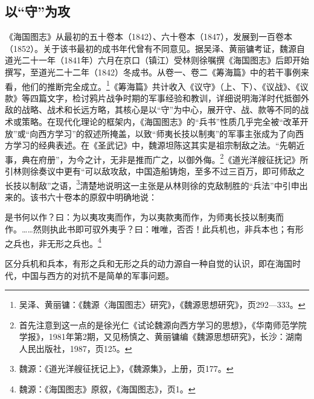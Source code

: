 \documentclass[a4paper, 12pt, openright]{ctexbook}
\renewenvironment{quote}
  {\list{}{\rightmargin2\ccwd \leftmargin2\ccwd \itemindent=2\ccwd \listparindent=2\ccwd}%
   \item\relax\small\kaishu\color{black}}
  {\endlist}
\begin{document}
\subsection{以“守”为攻}

《海国图志》从最初的五十卷本（1842）、六十卷本（1847），发展到一百卷本（1852）。关于该书最初的成书年代曾有不同意见。据吴泽、黄丽镛考证，魏源自道光二十一年（1841年）六月在京口（镇江）受林则徐嘱撰《海国图志》后即开始撰写，至道光二十二年（1842）冬成书。从卷一、卷二《筹海篇》中的若干事例来看，他们的推断完全成立。\footnote{吴泽、黄丽镛：《魏源〈海国图志〉研究》，《魏源思想研究》，页292—333。}《筹海篇》共计收入《议守》（上、下）、《议战》、《议款》等四篇文字，检讨鸦片战争时期的军事经验和教训，详细说明海洋时代抵御外敌的战略、战术和长远方略，其核心是以“守”为中心，展开守、战、款等不同的战术或策略。在现代化理论的框架内，《海国图志》的“兵书”性质几乎完全被“改革开放”或“向西方学习”的叙述所掩盖，以致“师夷长技以制夷”的军事主张成为了向西方学习的经典表述。在《圣武记》中，魏源坦陈这其实是祖宗制敌之法。“先朝近事，典在府册”，为今之计，无非是推而广之，以御外侮。\footnote{首先注意到这一点的是徐光仁《试论魏源向西方学习的思想》，《华南师范学院学报》，1981年第2期，又见杨慎之、黄丽镛编《魏源思想研究》，长沙：湖南人民出版社，1987，页125。}《道光洋艘征抚记》所引林则徐奏议中更有“可以敌攻敌，中国造船铸炮，至多不过三百万，即可师敌之长技以制敌”之语，\footnote{魏源：《道光洋艘征抚记上》，《魏源集》，上册，页177。}清楚地说明这一主张是从林则徐的克敌制胜的“兵法”中引申出来的。该书六十卷本的原叙中明确地说：

\begin{quote}
是书何以作？曰：为以夷攻夷而作，为以夷款夷而作，为师夷长技以制夷而作。……然则执此书即可驭外夷乎？曰：唯唯，否否！此兵机也，非兵本也；有形之兵也，非无形之兵也。\footnote{魏源：《海国图志》原叙，《海国图志》，页1。}
\end{quote}

区分兵机和兵本，有形之兵和无形之兵的动力源自一种自觉的认识，即在海国时代，中国与西方的对抗不是简单的军事问题。
\end{document}
